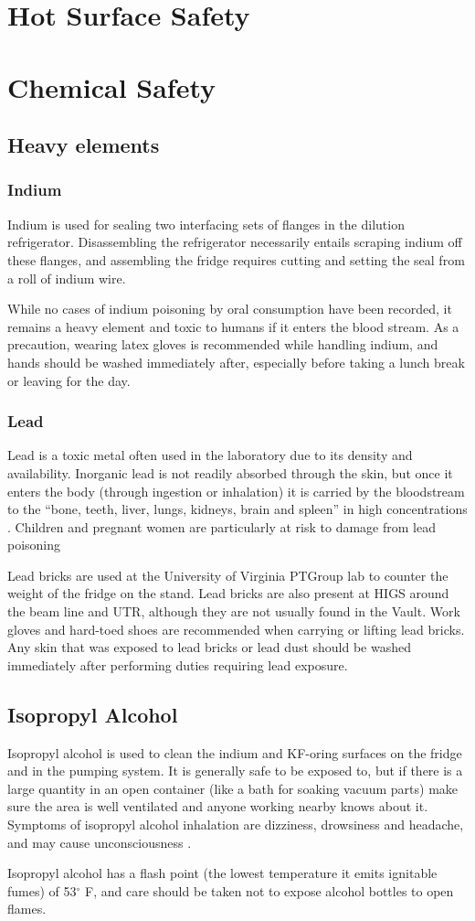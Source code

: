 \section{Hot Surface Safety}
\section{Chemical Safety}
\subsection{Heavy elements}
\subsubsection{Indium}
Indium is used for sealing two interfacing sets of flanges in the dilution refrigerator.  Disassembling the refrigerator necessarily entails scraping indium off these flanges, and assembling the fridge requires cutting and setting the seal from a roll of indium wire.

While no cases of indium poisoning by oral consumption have been recorded, it remains a heavy element and toxic to humans if it enters the blood stream.  As a precaution, wearing latex gloves is recommended while handling indium, and hands should be washed immediately after, especially before taking a lunch break or leaving for the day.

\subsubsection{Lead}
Lead is a toxic metal often used in the laboratory due to its density and availability.  Inorganic lead is not readily absorbed through the skin, but once it enters the body (through ingestion or inhalation) it is carried by the bloodstream to the ``bone, teeth, liver, lungs, kidneys, brain and spleen'' in high concentrations \cite{aafp98}.  Children and pregnant women are particularly at risk to damage from lead poisoning \cite{epa13}


Lead bricks are used at the University of Virginia PTGroup lab to counter the weight of the fridge on the stand.  Lead bricks are also present at HIGS around the beam line and UTR, although they are not usually found in the Vault.  Work gloves and hard-toed shoes are recommended when carrying or lifting lead bricks.  Any skin that was exposed to lead bricks or lead dust should be washed immediately after performing duties requiring lead exposure.

\subsection{Isopropyl Alcohol}
Isopropyl alcohol is used to clean the indium and KF-oring surfaces on the fridge and in the pumping system.  It is generally safe to be exposed to, but if there is a large quantity in an open container (like a bath for soaking vacuum parts) make sure the area is well ventilated and anyone working nearby knows about it.  Symptoms of isopropyl alcohol inhalation are dizziness, drowsiness and headache, and may cause unconsciousness \cite{isopropmsds}. 

Isopropyl alcohol has a flash point (the lowest temperature it emits ignitable fumes) of 53$^\circ$ F, and care should be taken not to expose alcohol bottles to open flames.